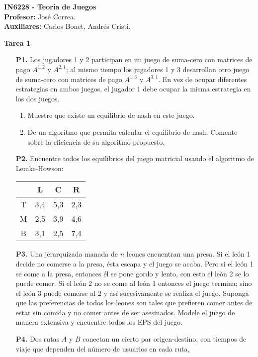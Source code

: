 \documentclass[11pt, spanish]{article}
\theoremstyle{plain}
\begin{document}

\begin{flushleft}
  \textbf{IN6228 - Teor\'ia de Juegos}
  \\\textbf{Profesor:} Jos\'e Correa.
  \\\textbf{Auxiliares:} Carlos Bonet, Andr\'es Cristi.
\end{flushleft}


\begin{center}
  \Large{\textbf{Tarea 1}}
\end{center}




\begin{itemize}
  \item[\textbf{P1.}] Los jugadores 1 y 2 participan en un juego de suma-cero con matrices de pago $A^{1,2}$ y $A^{2,1}$; al mismo tiempo los jugadores 1 y 3 desarrollan otro juego de suma-cero con matrices de pago $A^{1,3}$ y $A^{3,1}$. En vez de ocupar diferentes estrategias en ambos juegos, el jugador 1 debe ocupar la misma estrategia en los dos juegos.
  \begin{enumerate}
    \item Muestre que existe un equilibrio de nash en este juego.
    \item De un algoritmo que permita calcular el equilibrio de nash. Comente sobre la eficiencia de su algoritmo propuesto.
  \end{enumerate}

  \item[\textbf{P2.}] Encuentre todos los equilibrios del juego matricial usando el algoritmo de Lemke-Howson:

     \begin{center}
      \begin{tabular}{|c|c|c|c|}
          \hline
            &L & C & R\\
          \hline\hline
          T&3,4& 5,3 & 2,3\\
          M& 2,5& 3,9& 4,6\\
          B& 3,1 & 2,5& 7,4\\
          \hline
      \end{tabular}
      \end{center}

  \item[\textbf{P3.}] Una jerarquizada manada de $n$ leones encuentran una presa. Si el le\'on 1 decide no comerse a la presa, \'esta escapa y el juego se acaba. Pero si el le\'on 1 se come a la presa, entonces \'el se pone gordo y lento, con esto el le\'on 2 se lo puede comer. Si el le\'on 2 no se come al le\'on 1 entonces el juego termina; sino el le\'on 3 puede comerse al 2 y as\'i sucesivamente se realiza el juego. Suponga que las preferencias de todos los leones son tales que prefieren comer antes de estar sin comida y no comer antes de ser asesinados. Modele el juego de manera extensiva y encuentre todos los EPS del juego.

  \item[\textbf{P4.}] Dos rutas $A$ y $B$ conectan un cierto par 
  origen-destino, con tiempos de viaje que dependen del número de
  usuarios en cada ruta,
  

\end{itemize}
\end{document}
